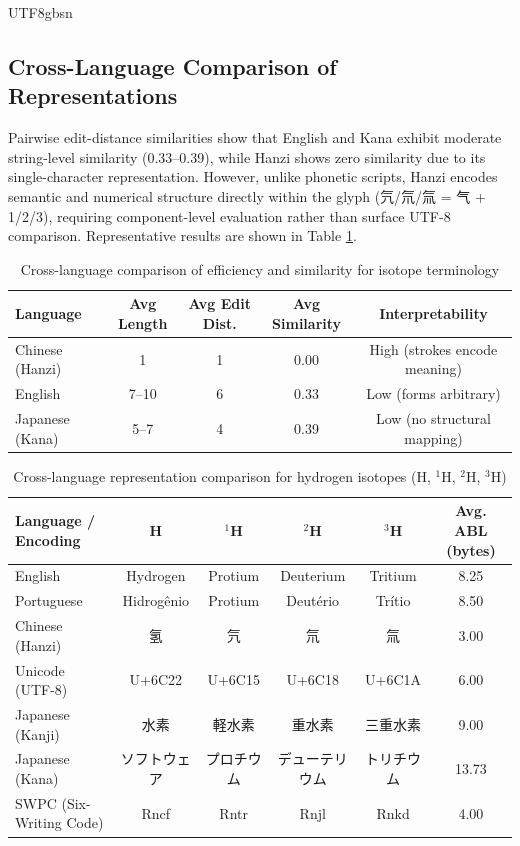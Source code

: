 \documentclass[conference]{IEEEtran}
\begin{document}
\begin{CJK*}{UTF8}{gbsn}
\subsection{Cross-Language Comparison of Representations}
Pairwise edit-distance similarities show that English and Kana exhibit moderate string-level similarity (0.33–0.39), while Hanzi shows zero similarity due to its single-character representation. However, unlike phonetic scripts, Hanzi encodes semantic and numerical structure directly within the glyph (氕/氘/氚 = 气 + 1/2/3), requiring component-level evaluation rather than surface UTF-8 comparison. Representative results are shown in Table \ref{tab:language_comparison}.

\begin{table}[h!]
\centering
\caption{Cross-language comparison of efficiency and similarity for isotope terminology}
\label{tab:language_comparison}
\begin{tabular}{|l|c|c|c|c|}
\hline
\textbf{Language} & \textbf{Avg Length} & \textbf{Avg Edit Dist.} & \textbf{Avg Similarity} & \textbf{Interpretability} \\
\hline
Chinese (Hanzi) & 1 & 1 & 0.00 & High (strokes encode meaning) \\
\hline
English & 7--10 & 6 & 0.33 & Low (forms arbitrary) \\
\hline
Japanese (Kana) & 5--7 & 4 & 0.39 & Low (no structural mapping) \\
\hline
\end{tabular}
\end{table}

\begin{table}[htbp]
\centering
\caption{Cross-language representation comparison for hydrogen isotopes (H, $^{1}$H, $^{2}$H, $^{3}$H)}
\label{tab:isotope_comparison}
\footnotesize
\renewcommand{\arraystretch}{1.2}
\begin{tabular}{|l|c|c|c|c|c|}
\hline
\toprule
\textbf{Language / Encoding} & \textbf{H} & \textbf{$^{1}$H} & \textbf{$^{2}$H} & \textbf{$^{3}$H} & \textbf{Avg. ABL (bytes)} \\
\midrule
\hline
English & Hydrogen & Protium & Deuterium & Tritium & 8.25 \\
\hline
Portuguese & Hidrogênio & Protium & Deutério & Trítio & 8.50 \\
\hline
Chinese (Hanzi) & 氢 & 氕 & 氘 & 氚 & 3.00 \\
\hline
Unicode (UTF-8) & U+6C22 & U+6C15 & U+6C18 & U+6C1A & 6.00 \\
\hline
Japanese (Kanji) & 水素 & 軽水素 & 重水素 & 三重水素 & 9.00 \\
\hline
Japanese (Kana) & ソフトウェア & プロチウム & デューテリウム & トリチウム & 13.73 \\
\hline
SWPC (Six-Writing Code) & Rncf & Rntr & Rnjl & Rnkd & 4.00 \\
\bottomrule
\hline
\end{tabular}
\end{table}




\end{CJK*}
\end{document}
